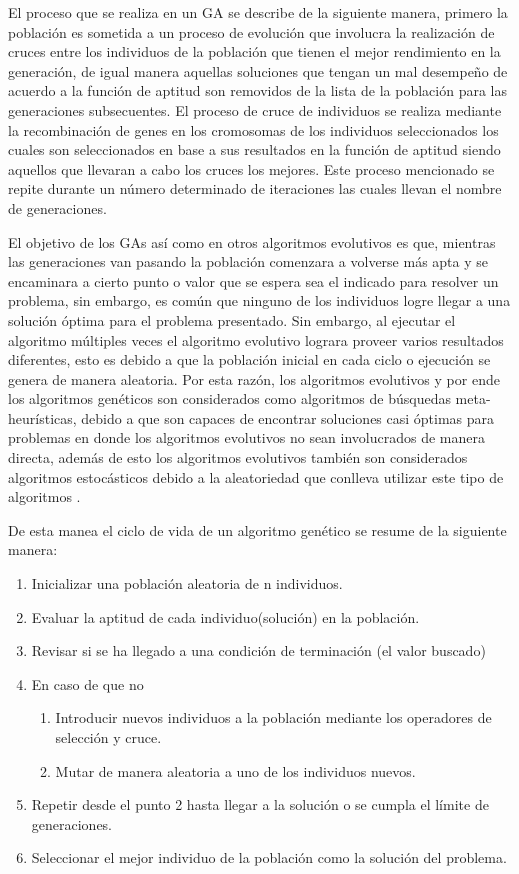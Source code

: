 El proceso que se realiza en un GA se describe de la siguiente manera, primero
la población es sometida a un proceso de evolución que involucra la realización
de cruces entre los individuos de la población que tienen el mejor rendimiento
en la generación, de igual manera aquellas soluciones que tengan un mal
desempeño de acuerdo a la función de aptitud son removidos de la lista de la
población para las generaciones subsecuentes. El proceso de cruce de individuos
se realiza mediante la recombinación de genes en los cromosomas de los
individuos seleccionados los cuales son seleccionados en base a sus resultados
en la función de aptitud siendo aquellos que llevaran a cabo los cruces los
mejores. Este proceso mencionado se repite durante un número determinado de
iteraciones las cuales llevan el nombre de generaciones.

El objetivo de los GAs así como en otros algoritmos evolutivos es que, mientras
las generaciones van pasando la población comenzara a volverse más apta y se
encaminara a cierto punto o valor que se espera sea el indicado para resolver un
problema, sin embargo, es común que ninguno de los individuos logre llegar a una
solución óptima para el problema presentado. Sin embargo, al ejecutar el
algoritmo múltiples veces el algoritmo evolutivo lograra proveer varios
resultados diferentes, esto es debido a que la población inicial en cada ciclo o
ejecución se genera de manera aleatoria. Por esta razón, los algoritmos
evolutivos y por ende los algoritmos genéticos son considerados como algoritmos
de búsquedas meta-heurísticas, debido a que son capaces de encontrar soluciones
casi óptimas para problemas en donde los algoritmos evolutivos no sean
involucrados de manera directa, además de esto los algoritmos evolutivos también
son considerados algoritmos estocásticos debido a la aleatoriedad que conlleva
utilizar este tipo de algoritmos \cite{Harik1999}.

De esta manea el ciclo de vida de un algoritmo genético se resume de la
siguiente manera: 

\begin{enumerate}
    \item Inicializar una población aleatoria de n individuos.
    \item Evaluar la aptitud de cada individuo(solución) en la población.
    \item Revisar si se ha llegado a una condición de terminación (el valor buscado)
    \item En caso de que no
    \begin{enumerate}
        \item Introducir nuevos individuos a la población mediante los
        operadores de selección y cruce.
        \item Mutar de manera aleatoria a uno de los individuos nuevos.
    \end{enumerate} 
    \item Repetir desde el punto 2 hasta llegar a la solución o se cumpla el
    límite de generaciones.
    \item Seleccionar el mejor individuo de la población como la solución del problema.
\end{enumerate}

